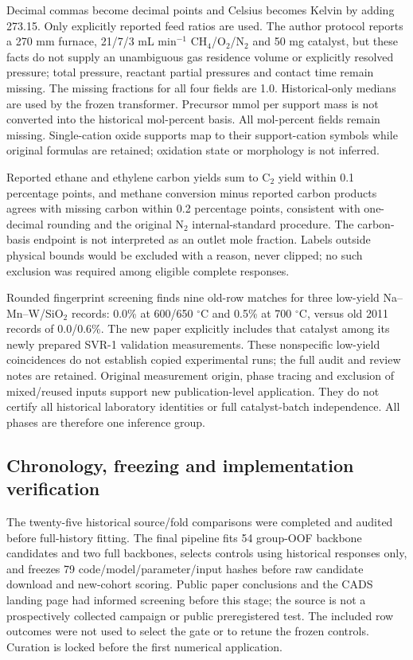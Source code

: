 Decimal commas become decimal points and Celsius becomes Kelvin by adding 273.15. Only explicitly reported feed ratios are used. The author protocol reports a 270 mm furnace, 21/7/3 mL min$^{-1}$ CH$_4$/O$_2$/N$_2$ and 50 mg catalyst, but these facts do not supply an unambiguous gas residence volume or explicitly resolved pressure; total pressure, reactant partial pressures and contact time remain missing. The missing fractions for all four fields are 1.0. Historical-only medians are used by the frozen transformer. Precursor mmol per support mass is not converted into the historical mol-percent basis. All mol-percent fields remain missing. Single-cation oxide supports map to their support-cation symbols while original formulas are retained; oxidation state or morphology is not inferred.

Reported ethane and ethylene carbon yields sum to C$_2$ yield within 0.1 percentage points, and methane conversion minus reported carbon products agrees with missing carbon within 0.2 percentage points, consistent with one-decimal rounding and the original N$_2$ internal-standard procedure. The carbon-basis endpoint is not interpreted as an outlet mole fraction. Labels outside physical bounds would be excluded with a reason, never clipped; no such exclusion was required among eligible complete responses.

Rounded fingerprint screening finds nine old-row matches for three low-yield Na--Mn--W/SiO$_2$ records: 0.0\% at 600/650 $^{\circ}$C and 0.5\% at 700 $^{\circ}$C, versus old 2011 records of 0.0/0.6\%. The new paper explicitly includes that catalyst among its newly prepared SVR-1 validation measurements. These nonspecific low-yield coincidences do not establish copied experimental runs; the full audit and review notes are retained. Original measurement origin, phase tracing and exclusion of mixed/reused inputs support new publication-level application. They do not certify all historical laboratory identities or full catalyst-batch independence. All phases are therefore one inference group.

\subsection{Chronology, freezing and implementation verification}
The twenty-five historical source/fold comparisons were completed and audited before full-history fitting. The final pipeline fits 54 group-OOF backbone candidates and two full backbones, selects controls using historical responses only, and freezes 79 code/model/parameter/input hashes before raw candidate download and new-cohort scoring. Public paper conclusions and the CADS landing page had informed screening before this stage; the source is not a prospectively collected campaign or public preregistered test. The included row outcomes were not used to select the gate or to retune the frozen controls. Curation is locked before the first numerical application.

